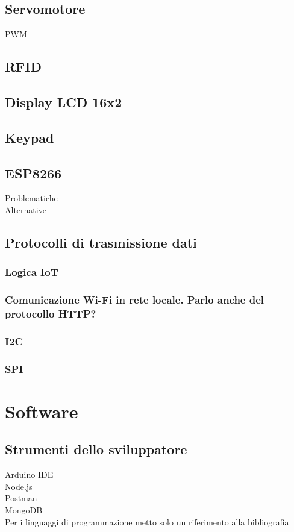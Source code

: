 \documentclass[12pt]{report}
\begin{document}
\section{Servomotore}
PWM
\\ 
\section{RFID}
%
\section{Display LCD 16x2}
%
\section{Keypad}
%
\section{ESP8266}
%
Problematiche
\\
Alternative
\section{Protocolli di trasmissione dati}
\subsection{Logica IoT}
%
\subsection{Comunicazione Wi-Fi in rete locale. Parlo anche del protocollo HTTP?}
%
\subsection{I2C}
%
\subsection{SPI}
% 
\chapter{Software}
\label{cap3}
%
%
%
\section{Strumenti dello sviluppatore}
Arduino IDE
\\
Node.js
\\
Postman
\\
MongoDB 
\\
Per i linguaggi di programmazione metto solo un riferimento alla bibliografia
%
%
\end{document}
